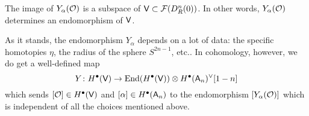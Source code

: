 \documentclass[11pt]{amsart}
\begin{document}
\begin{lem}
The image of $Y_\alpha(\mathcal O)$ is a subspace of $\mathsf V \subset \mathcal F(D^n_R(0))$. 
In other words, $Y_{\alpha}(\mathcal O)$ determines an endomorphism of $\mathsf V$. 
\end{lem}

As it stands, the endomorphism $Y_\alpha$ depends on a lot of data: the specific homotopies $\eta$, the radius of the sphere $S^{2n-1}$, etc.. 
In cohomology, however, we do get a well-defined map 
\[
Y \colon H^\bullet(\mathsf V) \to {\rm End}(H^\bullet(\mathsf V)) \otimes H^\bullet(\mathsf A_n)^\vee [1-n]
\]
which sends $[\mathcal O] \in H^\bullet(\mathsf V)$ and $[\alpha] \in H^\bullet(\mathsf A_n)$ to the endomorphism $[Y_\alpha(\mathcal O)]$ which is independent of all the choices mentioned above.
\end{document}
